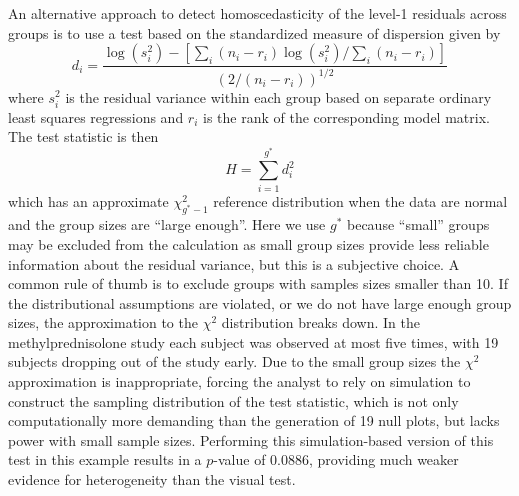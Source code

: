 \documentclass[12pt]{article} %
\newcommand{\alnote}[1]{\todo[inline,color=green!40]{#1}} %
\newcommand{\hhnote}[1]{\todo[inline,color=orange!40]{#1}}
\begin{document}
An alternative approach to detect homoscedasticity of the level-1 residuals across groups is to use a test  \citep{Raudenbush:2002} based on the standardized measure of dispersion given by
%
\begin{equation}\label{eq:d}
	d_i = \frac{\log\left( s_i^2 \right) - \left[ \sum_i (n_i - r_i) \log\left( s_i^2 \right) / \sum_i  (n_i - r_i) \right]}{\left(2 / (n_i - r_i)\right)^{1/2}}
\end{equation}
%
where $s_i^2$ is the residual variance within each group based on separate ordinary least squares regressions and $r_i$ is the rank of the corresponding model matrix. The test statistic is then
%
\begin{equation}
	H = \sum_{i=1}^{g^*} d_i^2
\end{equation}
%
which has an approximate $\chi^2_{g^*-1}$ reference distribution when the data are normal and the group sizes are ``large enough''. Here we use $g^*$ because ``small'' groups may be excluded from the calculation as small group sizes provide less reliable information about the residual variance, but this is a subjective choice. A common rule of thumb is to exclude groups with samples sizes smaller than 10. If the distributional assumptions are violated, or we do not have large enough group sizes,  the approximation to the $\chi^2$ distribution breaks down. In the methylprednisolone study each subject was observed at most five times, with 19 subjects dropping out of the study early. Due to the small group sizes the $\chi^2$ approximation is inappropriate, forcing the analyst to rely on simulation to construct the sampling distribution of the test statistic, which is not only computationally more demanding than the generation of 19 null plots, but lacks power with small sample sizes. Performing this simulation-based version of this test in this example results in a $p$-value of 0.0886, providing much weaker evidence for heterogeneity than the visual test. 

%
\end{document}
